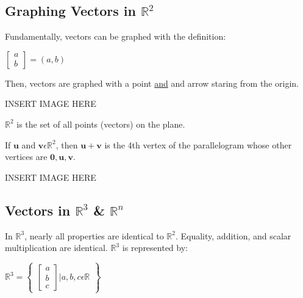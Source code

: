 \documentclass{report}
\begin{document}
\subsection*{Graphing Vectors in $\mathbb{R}^2$}
Fundamentally, vectors can be graphed with the definition:
\begin{center}
	$\begin{bmatrix} a \\ b \end{bmatrix} = (a, b)$
\end{center}
Then, vectors are graphed with a point \underline{and} and arrow staring from the origin.
\begin{center}
	INSERT IMAGE HERE
\end{center}
$\mathbb{R}^2$ is the set of all points (vectors) on the plane.
\begin{definition}
	If $\mathbf{u}$ and $\mathbf{v} \epsilon \mathbb{R}^2$, then $\mathbf{u} + \mathbf{v}$ is the 4th vertex of the parallelogram whose other vertices are $\mathbf{0},\mathbf{u}, \mathbf{v}$.
\end{definition}
\begin{center}
	INSERT IMAGE HERE
\end{center}
\subsection*{Vectors in $\mathbb{R}^3$ \& $\mathbb{R}^n$}
In $\mathbb{R}^3$, nearly all properties are identical to $\mathbb{R}^2$. Equality, addition, and scalar multiplication are identical. $\mathbb{R}^3$ is represented by:
\begin{center}
	$\mathbb{R}^3 = \begin{Bmatrix} \begin{bmatrix} a \\ b \\ c \end{bmatrix} \vert a,b,c \epsilon \mathbb{R} \end{Bmatrix}$
\end{center}
\end{document}

